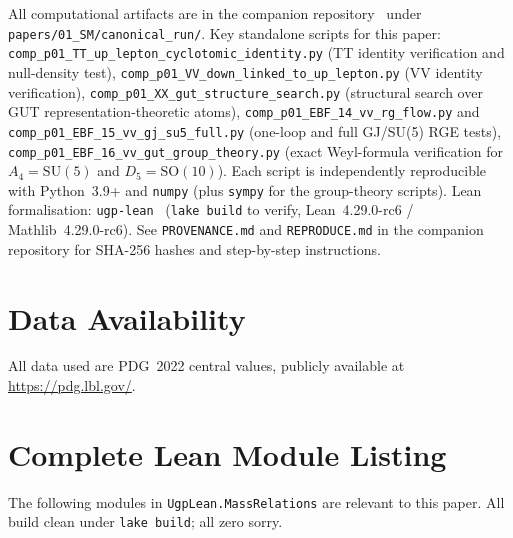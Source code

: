 \documentclass[11pt]{article}
\theoremstyle{remark}
\begin{document}
{\sloppy
All computational artifacts are in the companion repository~\cite{ugp-physics-repo}
under \texttt{papers/01\_SM/canonical\_run/}.  Key standalone scripts for this paper:
\texttt{comp\_p01\_TT\_up\_lepton\_cyclotomic\_identity.py} (TT identity verification and
null-density test), \texttt{comp\_p01\_VV\_down\_linked\_to\_up\_lepton.py} (VV identity
verification), \texttt{comp\_p01\_XX\_gut\_structure\_search.py} (structural search over
GUT representation-theoretic atoms), \texttt{comp\_p01\_EBF\_14\_vv\_rg\_flow.py} and
\texttt{comp\_p01\_EBF\_15\_vv\_gj\_su5\_full.py} (one-loop and full GJ/SU(5) RGE tests),
\texttt{comp\_p01\_EBF\_16\_vv\_gut\_group\_theory.py} (exact Weyl-formula verification
for $A_4 = \mathrm{SU}(5)$ and $D_5 = \mathrm{SO}(10)$).  Each script is independently
reproducible with Python~3.9+ and \texttt{numpy} (plus \texttt{sympy} for the
group-theory scripts).  Lean formalisation: \texttt{ugp-lean}~\cite{ugp-lean}
(\texttt{lake build} to verify, Lean~4.29.0-rc6 / Mathlib~4.29.0-rc6).
See \texttt{PROVENANCE.md} and \texttt{REPRODUCE.md} in the companion repository for
SHA-256 hashes and step-by-step instructions.\par}

\section*{Data Availability}

All data used are PDG~2022 central values, publicly available
at \url{https://pdg.lbl.gov/}.

\appendix

\section{Complete Lean Module Listing}
\label{app:lean_full}

The following modules in \texttt{UgpLean.MassRelations} are relevant to this
paper.  All build clean under \texttt{lake build}; all zero sorry.
\end{document}
